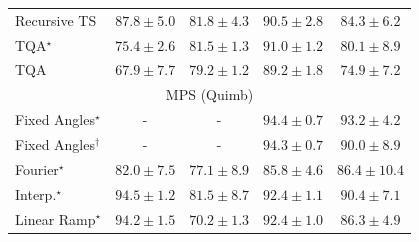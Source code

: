 \begin{tabular}{l|cccc|}
Recursive TS & {\cellcolor[HTML]{88439E}} \color[HTML]{F1F1F1} $87.8\pm 5.0$ & {\cellcolor[HTML]{8C88BF}} \color[HTML]{F1F1F1} $81.8\pm 4.3$ & {\cellcolor[HTML]{831D85}} \color[HTML]{F1F1F1} $90.5\pm 2.8$ & {\cellcolor[HTML]{8C6AB1}} \color[HTML]{F1F1F1} $84.3\pm 6.2$ \\
TQA$^\star$ & {\cellcolor[HTML]{ABC5DF}} \color[HTML]{000000} $75.4\pm 2.6$ & {\cellcolor[HTML]{8C8BC0}} \color[HTML]{F1F1F1} $81.5\pm 1.3$ & {\cellcolor[HTML]{821781}} \color[HTML]{F1F1F1} $91.0\pm 1.2$ & {\cellcolor[HTML]{8E9AC8}} \color[HTML]{F1F1F1} $80.1\pm 8.9$ \\
TQA & {\cellcolor[HTML]{EAF3F8}} \color[HTML]{000000} $67.9\pm 7.7$ & {\cellcolor[HTML]{92A4CD}} \color[HTML]{F1F1F1} $79.2\pm 1.2$ & {\cellcolor[HTML]{852F91}} \color[HTML]{F1F1F1} $89.2\pm 1.8$ & {\cellcolor[HTML]{B0C9E1}} \color[HTML]{000000} $74.9\pm 7.2$ \\
\cline{1-5}
\multicolumn{5}{c}{\rule{0pt}{8pt}MPS (Quimb)} \\
\midrule
Fixed Angles$^\star$ & {\cellcolor[HTML]{000000}} \color[HTML]{F1F1F1} {\cellcolor{white}} \color{black} - & {\cellcolor[HTML]{000000}} \color[HTML]{F1F1F1} {\cellcolor{white}} \color{black} - & {\cellcolor[HTML]{712806}} \color[HTML]{F1F1F1} $94.4\pm 0.7$ & {\cellcolor[HTML]{832D05}} \color[HTML]{F1F1F1} $93.2\pm 4.2$ \\
Fixed Angles$^\dagger$ & {\cellcolor[HTML]{000000}} \color[HTML]{F1F1F1} {\cellcolor{white}} \color{black} - & {\cellcolor[HTML]{000000}} \color[HTML]{F1F1F1} {\cellcolor{white}} \color{black} - & {\cellcolor[HTML]{732905}} \color[HTML]{F1F1F1} $94.3\pm 0.7$ & {\cellcolor[HTML]{AE3E03}} \color[HTML]{F1F1F1} $90.0\pm 8.9$ \\
Fourier$^\star$ & {\cellcolor[HTML]{F78921}} \color[HTML]{F1F1F1} $82.0\pm 7.5$ & {\cellcolor[HTML]{FEC14C}} \color[HTML]{000000} $77.1\pm 8.9$ & {\cellcolor[HTML]{DE610C}} \color[HTML]{F1F1F1} $85.8\pm 4.6$ & {\cellcolor[HTML]{D95B09}} \color[HTML]{F1F1F1} $86.4\pm 10.4$ \\
Interp.$^\star$ & {\cellcolor[HTML]{702806}} \color[HTML]{F1F1F1} $94.5\pm 1.2$ & {\cellcolor[HTML]{F98E23}} \color[HTML]{F1F1F1} $81.5\pm 8.7$ & {\cellcolor[HTML]{8E3104}} \color[HTML]{F1F1F1} $92.4\pm 1.1$ & {\cellcolor[HTML]{A93C03}} \color[HTML]{F1F1F1} $90.4\pm 7.1$ \\
Linear Ramp$^\star$ & {\cellcolor[HTML]{742905}} \color[HTML]{F1F1F1} $94.2\pm 1.5$ & {\cellcolor[HTML]{FFF3B4}} \color[HTML]{000000} $70.2\pm 1.3$ & {\cellcolor[HTML]{8E3104}} \color[HTML]{F1F1F1} $92.4\pm 1.0$ & {\cellcolor[HTML]{DA5C0A}} \color[HTML]{F1F1F1} $86.3\pm 4.9$ \\

\end{tabular}
